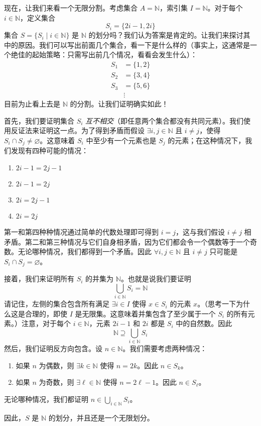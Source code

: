 \begin{example}
    现在，让我们来看一个无限分割。考虑集合 $A = \mathbb{N}$，索引集 $I = \mathbb{N}$。对于每个 $i \in \mathbb{N}$，定义集合
    \[S_i = \{2i - 1, 2i\}\]
    集合 $S = \{S_i \mid i \in \mathbb{N}\}$ 是 $\mathbb{N}$ 的划分吗？我们认为答案是肯定的。让我们来探讨其中的原因。我们可以写出前面几个集合，看一下是什么样的（事实上，这通常是一个绝佳的起始策略：只需写出前几个情况，看看会发生什么）：
    \begin{align*}
        S_1 & = \{1, 2\} \\
        S_2 & = \{3, 4\} \\
        S_3 & = \{5, 6\} \\
        &\vdots
    \end{align*}
    目前为止看上去是 $\mathbb{N}$ 的分割。让我们证明确实如此！

    首先，我们要证明集合 $S_i$ \emph{互不相交}（即任意两个集合都没有共同元素）。我们使用反证法来证明这一点。为了得到矛盾而假设 $\exists i, j \in \mathbb{N}$ 且 $i \ne j$，使得 $S_i \cap S_j \ne \varnothing$。这意味着 $S_i$ 中至少有一个元素也是 $S_j$ 的元素；在这种情况下，我们发现有四种可能的情况：
    \begin{enumerate}
        \item $2i - 1 = 2j - 1$
        \item $2i - 1 = 2j$
        \item $2i = 2j - 1$
        \item $2i = 2j$
    \end{enumerate}
    第一和第四种种情况通过简单的代数处理即可得到 $i = j$，这与我们假设 $i \ne j$ 相矛盾。第二和第三种情况与它们自身相矛盾，因为它们都会令一个偶数等于一个奇数。无论哪种情况，我们都得到一个矛盾。因此 $\forall i, j \in \mathbb{N}$ 且 $i \ne j$ 只可能是 $S_i \cap S_j = \varnothing$。

    接着，我们来证明所有 $S_i$ 的并集为 $\mathbb{N}$。也就是说我们要证明
    \[\bigcup_{i \in \mathbb{N}} S_i = \mathbb{N}\]
    请记住，左侧的集合包含所有满足 $\exists i \in I$ 使得 $x \in S_i$ 的元素 $x$。（思考一下为什么这是合理的，即使 $I$ 是无限集。这意味着并集包含了至少属于一个 $S_i$ 的所有元素。）注意，对于每个 $i \in \mathbb{N}$，元素 $2i - 1$ 和 $2i$ 都是 $S_i$ 中的自然数。因此
    \[\mathbb{N} \supseteq \bigcup_{i \in \mathbb{N}} S_i\]
    然后，我们证明反方向包含。设 $n \in \mathbb{N}$。我们需要考虑两种情况：
    \begin{enumerate}[label=(\arabic*)]
        \item 如果 $n$ 为偶数，则 $\exists k \in \mathbb{N}$ 使得 $n = 2k$。因此 $n \in S_k$。
        \item 如果 $n$ 为奇数，则 $\exists \ell \in \mathbb{N}$ 使得 $n = 2\ell-1$。因此 $n \in S_\ell$。
    \end{enumerate}
    无论哪种情况，我们都证明 $\displaystyle n \in \bigcup_{i \in \mathbb{N}} S_i$。

    因此，$S$ 是 $\mathbb{N}$ 的划分，并且还是一个无限划分。
\end{example}

